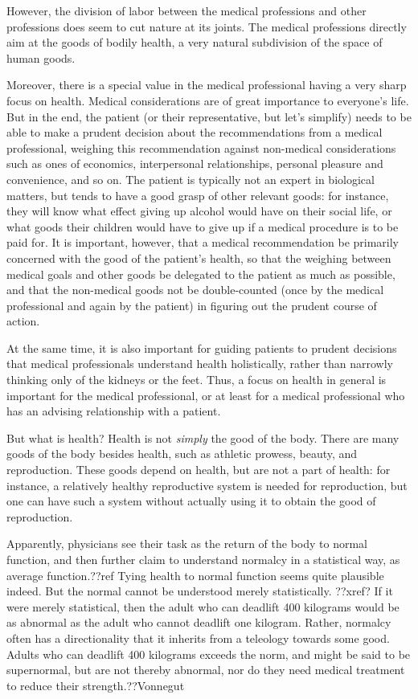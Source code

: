 However, the division of labor between the medical professions and other professions does seem to cut nature at its joints. The medical professions directly
aim at the goods of bodily health, a very natural subdivision of the space of human goods.

Moreover, there is a special value in the medical professional
having a very sharp focus on health. Medical considerations are of great importance to everyone's life. But in
the end, the patient (or their representative, but let's simplify) needs to be able to make a prudent decision about the recommendations
from a medical professional, weighing this recommendation against non-medical considerations such as ones of economics, interpersonal relationships, personal
pleasure and convenience, and so on. The patient is typically not an expert in biological matters, but tends to have a good grasp of other relevant goods:
for instance, they will know what effect giving up alcohol would have on their social life, or what goods their children would have to give up if a medical
procedure is to be paid for. It is important, however, that a medical recommendation be primarily concerned with the good of the patient's health, so that
the weighing between medical goals and other goods be delegated to the patient as much as possible, and that the non-medical goods not be double-counted (once by the
medical professional and again by the patient) in figuring out the prudent course of action.

At the same time, it is also important for guiding patients to prudent
decisions that medical professionals understand health holistically, rather than narrowly thinking only of the kidneys or the feet. Thus, a focus on health in general
is important for the medical professional, or at least for a medical professional who has an advising relationship with a patient.

But what is health? Health is not \textit{simply} the good of the body. There are many goods of the body besides health, such as
athletic prowess, beauty, and reproduction. These goods depend on health, but are not a part of health: for instance, a relatively healthy reproductive system is needed for
reproduction, but one can have such a system without actually using it to obtain the good of reproduction.

Apparently, physicians see their task as the return of the body to normal function, and then further claim to understand normalcy in a statistical way, as average
function.??ref Tying health to normal function seems quite plausible indeed. But the normal cannot be understood merely statistically. ??xref? If it were merely
statistical, then the adult who can deadlift 400 kilograms would be as abnormal
as the adult who cannot deadlift one kilogram. Rather, normalcy often has a directionality that it inherits from a teleology towards some good. Adults who
can deadlift 400 kilograms exceeds the norm, and might be said to be supernormal, but are not thereby abnormal, nor do they need medical treatment to reduce their
strength.??Vonnegut

